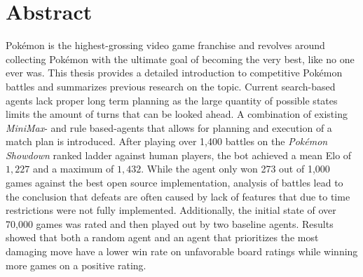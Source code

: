 \chapter*{Abstract}
Pokémon is the highest-grossing video game franchise and revolves around collecting Pokémon with the 
ultimate goal of becoming \grqq the very best, like no one ever was\grqq. This thesis provides a detailed
introduction to competitive Pokémon battles and summarizes previous research on the topic. Current
search-based agents lack proper long term planning as the large quantity of possible states limits
the amount of turns that can be looked ahead. A combination of existing \textit{MiniMax}-
and rule based-agents that allows for planning and execution of a match plan is introduced.
After playing over 1,400 battles on the \textit{Pokémon Showdown} ranked ladder against human players,
the bot achieved a mean Elo of $1,227$ and a maximum of $1,432$. While the agent only won 273 out of 
1,000 games against the best open source implementation, analysis of battles lead to the conclusion that defeats
are often caused by lack of features that due to time restrictions were not fully implemented. 
Additionally, the initial state of over 70,000 games was rated and then played out by two baseline 
agents. Results showed that both a random agent and an agent that prioritizes the most damaging
move have a lower win rate on unfavorable board ratings while winning more games on a positive rating. 
